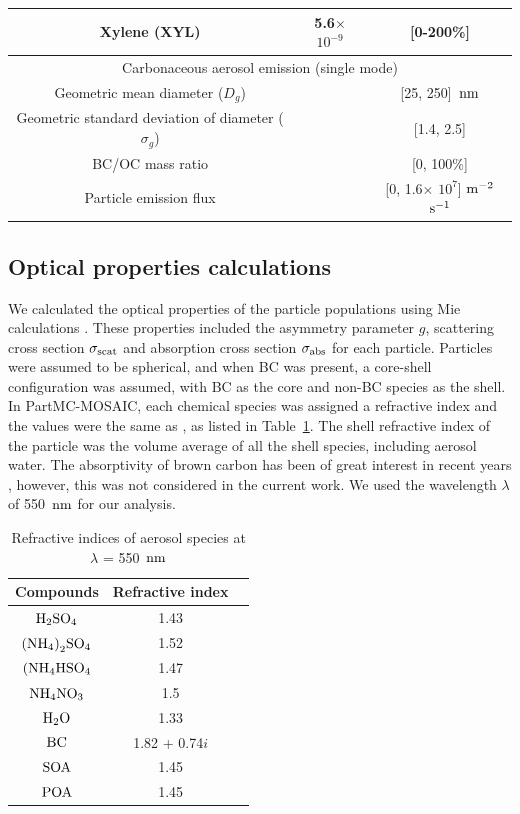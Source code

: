 \documentclass[edeposit,fullpage]{uiucthesis2009}
\makeatletter
\DeclareRobustCommand*\unit[1]
 {\ensuremath{%
   {\thinmuskip3mu\relax
    \def\mu{\text{\textmu}}\def~{\,}%
    \ifx\f@series\testbx\mathbf{#1}\else\mathrm{#1}\fi}}}
\makeatother
\begin{document}
\begin{table}
\begin{tabular}{ c c c  }
   Xylene (XYL) &5.6$\times$ $10^{-9}$&[0-200\%] \\
    \hline
    \multicolumn{3}{c}{Carbonaceous aerosol emission (single mode)} \\
    \hline
    Geometric mean diameter ($D_g$) &&[25, 250]~\unit{nm}\\
    Geometric standard deviation of diameter ($\sigma_g$) && [1.4, 2.5]\\
    BC/OC mass ratio && [0, 100\%] \\
    Particle emission flux && [0, 1.6$\times$ $10^{7}$] $\rm m^{-2}$ $\rm s^{-1}$ \\
	\hline
\end{tabular}
\end{table}

\subsection{Optical properties calculations}
We calculated the optical properties of the particle populations using
Mie calculations \citep{Zaveri2010a}. These properties included the
asymmetry parameter $g$, scattering cross section $\sigma_{\rm scat}$
and absorption cross section $\sigma_{\rm abs}$ for each
particle. Particles were assumed to be spherical, and when BC was
present, a core-shell configuration was assumed, with BC as the core
and non-BC species as the shell. In PartMC-MOSAIC, each chemical
species was assigned a refractive index and the values were the same 
as \citet{Zaveri2010a}, as listed
in Table~\ref{tab:refrc_inex}. The shell refractive index of the
particle was the volume average of all the shell species, including
aerosol water. The absorptivity of brown carbon has been of great
interest in recent years \citep{corbin2018brown, cappa2019light},
however, this was not considered in the current work. We used the
wavelength $\lambda$ of 550~\unit{nm} for our analysis.
\begin{table}
	\centering
	\caption{Refractive indices of aerosol species at $\lambda$ =
          550~\unit{nm}}
	\label{tab:refrc_inex}
	\begin{tabular}{ c  c  c }
		\hline 
		Compounds & Refractive index\\
       \hline
       $\rm H_2SO_4$ & 1.43 \\
       $\rm {(NH_4)}_2SO_4$ & 1.52 \\
       $\rm (NH_4HSO_4$ & 1.47 \\
       $\rm NH_4NO_3$ & 1.5 \\
       $\rm H_2O$ & 1.33 \\
       $\rm BC$ & 1.82 + 0.74$i$ \\
       $\rm SOA$ & 1.45  \\
       $\rm POA$ & 1.45 \\       
       \hline
	\end{tabular}
\end{table}
\end{document}
